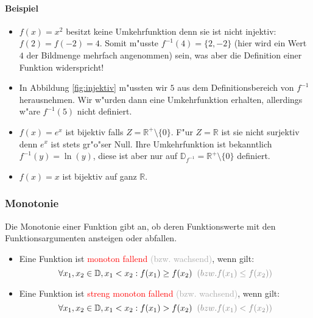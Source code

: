 \paragraph{Beispiel}
\begin{itemize}
\item $f(x) = x^2$ besitzt keine Umkehrfunktion denn sie ist nicht injektiv: $f(2) = f(-2) = 4$. Somit m"usste $f^{-1}(4) = \{2, -2\}$ (hier wird ein Wert $4$ der Bildmenge mehrfach angenommen) sein, was aber die Definition einer Funktion widerspricht!
\item In Abbildung \ref{fig:injektiv} m"ussten wir $5$ aus dem Definitionsbereich von $f^{-1}$ herausnehmen. Wir w"urden dann eine Umkehrfunktion erhalten, allerdings w"are $f^{-1}(5)$ nicht definiert.
\item $f(x) = e^x$ ist bijektiv falls $Z = \mathbb{R}^+  \setminus \{0\}$. F"ur $Z = \mathbb{R}$ ist sie nicht surjektiv denn $e^x$ ist stets gr"o"ser Null. Ihre Umkehrfunktion ist bekanntlich $f^{-1}(y) = \ln(y)$, diese ist aber nur auf $\mathbb{D}_{f^{-1}} =  \mathbb{R}^+ \setminus \{0\}$ definiert.
\item $f(x) = x$ ist bijektiv auf ganz $\mathbb{R}$.
\end{itemize}


\subsubsection{Monotonie}
Die Monotonie einer Funktion gibt an, ob deren Funktionswerte mit den Funktionsargumenten ansteigen oder abfallen.
\begin{itemize}
\item Eine Funktion ist \textcolor{red}{monoton fallend} \textcolor{DarkGrey}{(bzw. wachsend)}, wenn gilt:
\begin{equation*}
\forall x_1, x_2 \in\mathbb{D}, x_1 < x_2: f(x_1)\geq f(x_2) \hspace{0.2 cm}\textcolor{DarkGrey}{(bzw. f(x_1)\leq f(x_2))}
\end{equation*}
\item Eine Funktion ist \textcolor{red}{streng monoton fallend} \textcolor{DarkGrey}{(bzw. wachsend)}, wenn gilt:
\begin{equation*}
\forall x_1, x_2 \in\mathbb{D}, x_1 < x_2: f(x_1)>f(x_2) \hspace{0.2 cm}\textcolor{DarkGrey}{(bzw. f(x_1)<f(x_2))}
\end{equation*}
\end{itemize}

